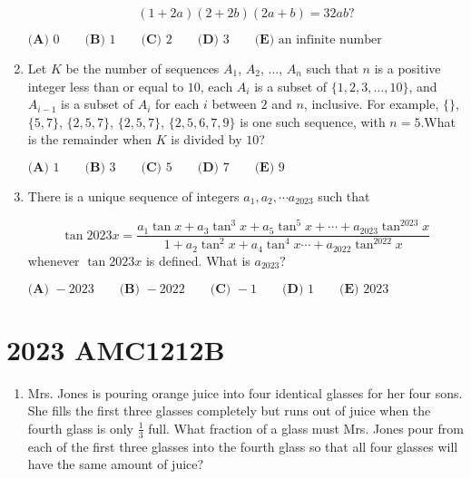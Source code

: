 \documentclass{article}
\begin{document}
\begin{enumerate}[label=\arabic*., itemsep=0.5em]
\begin{equation*}
(1+2a)(2+2b)(2a+b) = 32ab?
\end{equation*}


$\textbf{(A) }0\qquad\textbf{(B) }1\qquad\textbf{(C) }2\qquad\textbf{(D) }3\qquad\textbf{(E) }\text{an infinite number}$\par \vspace{0.5em}\item Let $K$ be the number of sequences $A_1$, $A_2$, $\dots$, $A_n$ such that $n$ is a positive integer less than or equal to $10$, each $A_i$ is a subset of $\{1, 2, 3, \dots, 10\}$, and $A_{i-1}$ is a subset of $A_i$ for each $i$ between $2$ and $n$, inclusive. For example, $\{\}$, $\{5, 7\}$, $\{2, 5, 7\}$, $\{2, 5, 7\}$, $\{2, 5, 6, 7, 9\}$ is one such sequence, with $n = 5$.What is the remainder when $K$ is divided by $10$?

$\textbf{(A) } 1 \qquad \textbf{(B) } 3 \qquad \textbf{(C) } 5 \qquad \textbf{(D) } 7 \qquad \textbf{(E) } 9$\par \vspace{0.5em}\item There is a unique sequence of integers $a_1, a_2, \cdots a_{2023}$ such that

\begin{equation*}
\tan2023x = \frac{a_1 \tan x + a_3 \tan^3 x + a_5 \tan^5 x + \cdots + a_{2023} \tan^{2023} x}{1 + a_2 \tan^2 x + a_4 \tan^4 x \cdots + a_{2022} \tan^{2022} x}
\end{equation*}
whenever $\tan 2023x$ is defined. What is $a_{2023}?$

$\textbf{(A) } -2023 \qquad\textbf{(B) } -2022 \qquad\textbf{(C) } -1 \qquad\textbf{(D) } 1 \qquad\textbf{(E) } 2023$\par \vspace{0.5em}\end{enumerate}\newpage\section*{2023 AMC1212B}\begin{enumerate}[label=\arabic*., itemsep=0.5em]\item Mrs. Jones is pouring orange juice into four identical glasses for her four sons. She fills the first three glasses completely but runs out of juice when the fourth glass is only $\frac{1}{3}$ full. What fraction of a glass must Mrs. Jones pour from each of the first three glasses into the fourth glass so that all four glasses will have the same amount of juice?


\end{enumerate}
\end{document}
